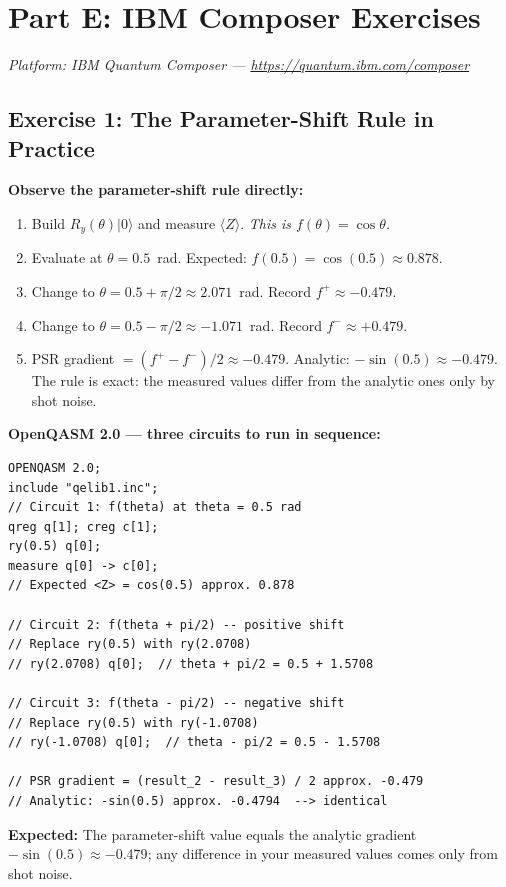 \documentclass[a4paper,11pt]{article}
\renewcommand{\ket}[1]{|#1\rangle}
\begin{document}
\section{Part E: IBM Composer Exercises}

\textit{Platform: IBM Quantum Composer — \url{https://quantum.ibm.com/composer}}

\subsection{Exercise 1: The Parameter-Shift Rule in Practice}

\begin{studentbox}
\textbf{Observe the parameter-shift rule directly:}
\begin{enumerate}
    \item Build $R_y(\theta)\ket{0}$ and measure $\langle Z\rangle$.
          \emph{This is $f(\theta)=\cos\theta$.}
    \item Evaluate at $\theta = 0.5$~rad. Expected: $f(0.5) = \cos(0.5) \approx 0.878$.
    \item Change to $\theta = 0.5 + \pi/2 \approx 2.071$~rad. Record $f^+ \approx -0.479$.
    \item Change to $\theta = 0.5 - \pi/2 \approx -1.071$~rad. Record $f^- \approx +0.479$.
    \item PSR gradient $= (f^+-f^-)/2 \approx -0.479$.
          Analytic: $-\sin(0.5) \approx -0.479$. The rule is exact: the measured values differ from the analytic ones only by shot noise.
\end{enumerate}

\medskip
\textbf{OpenQASM 2.0 — three circuits to run in sequence:}
\begin{lstlisting}[language={}]
OPENQASM 2.0;
include "qelib1.inc";
// Circuit 1: f(theta) at theta = 0.5 rad
qreg q[1]; creg c[1];
ry(0.5) q[0];
measure q[0] -> c[0];
// Expected <Z> = cos(0.5) approx. 0.878

// Circuit 2: f(theta + pi/2) -- positive shift
// Replace ry(0.5) with ry(2.0708)
// ry(2.0708) q[0];  // theta + pi/2 = 0.5 + 1.5708

// Circuit 3: f(theta - pi/2) -- negative shift
// Replace ry(0.5) with ry(-1.0708)
// ry(-1.0708) q[0];  // theta - pi/2 = 0.5 - 1.5708

// PSR gradient = (result_2 - result_3) / 2 approx. -0.479
// Analytic: -sin(0.5) approx. -0.4794  --> identical
\end{lstlisting}
\textbf{Expected:} The parameter-shift value equals the analytic gradient
$-\sin(0.5)\approx-0.479$; any difference in your measured values comes only from shot noise.
\end{studentbox}
\end{document}
